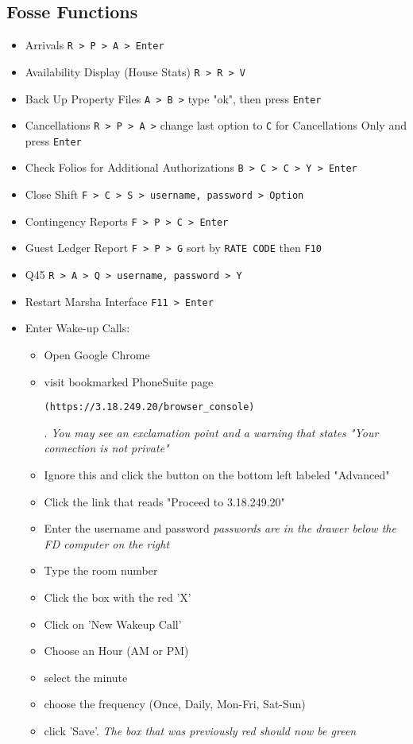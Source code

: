 \subsection*{Fosse Functions}
\begin{itemize}
    \item Arrivals \verb|R > P > A > Enter|
    \item Availability Display (House Stats) \verb|R > R > V|
    \item Back Up Property Files \verb|A > B >| type "ok", then press \verb|Enter|
    \item Cancellations \verb|R > P > A >| change last option to \verb|C| for Cancellations Only and press \verb|Enter|
    \item Check Folios for Additional Authorizations \verb|B > C > C > Y > Enter|
    \item Close Shift \verb|F > C > S > username, password > Option |
    \item Contingency Reports \verb|F > P > C > Enter|
    \item Guest Ledger Report \verb|F > P > G| sort by \verb|RATE CODE| then \verb|F10|
    \item Q45 \verb|R > A > Q > username, password > Y|
    \item Restart Marsha Interface \verb|F11 > Enter|
    \item Enter Wake-up Calls:
    \begin{itemize}
        \item Open Google Chrome
        \item visit bookmarked PhoneSuite page \begin{lstlisting}(https://3.18.249.20/browser_console)
        \end{lstlisting}.\newline 
        \textit{You may see an exclamation point and a warning that states "Your connection is not private"}
        \item Ignore this and click the button on the bottom left labeled "Advanced"
        \item Click the link that reads "Proceed to 3.18.249.20"
        \item Enter the username and password\newline 
        \textit{passwords are in the drawer below the FD computer on the right} 
        \item Type the room number
        \item Click the box with the red 'X'
        \item Click on 'New Wakeup Call' 
        \item Choose an Hour (AM or PM)
        \item select the minute
        \item choose the frequency (Once, Daily, Mon-Fri, Sat-Sun) 
        \item click 'Save'.\newline
        \textit{The box that was previously red should now be green}
    \end{itemize}
\end{itemize}